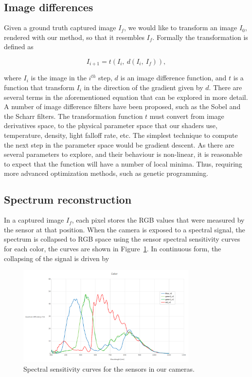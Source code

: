 \subsection{Image differences}
\label{sec:image_differences}

Given a ground truth captured image $I_f$, we would like to transform an image $I_0$, rendered with our method, so that it resembles $I_f$.
Formally the transformation is defined as

\begin{equation}
I_{i+1} = t(I_i,~d(I_i,~I_f)),
\end{equation}

where $I_i$ is the image in the $i^{th}$ step, $d$ is an image difference function, and $t$ is a function that transform $I_i$ in the direction of the gradient given by $d$.
There are several terms in the aforementioned equation that can be explored in more detail.
A number of image difference filters have been proposed, such as the Sobel and the Scharr filters.
The transformation function $t$ must convert from image derivatives space, to the physical parameter space that our shaders use, temperature, density, light falloff rate, etc.
The simplest technique to compute the next step in the parameter space would be gradient descent.
As there are several parameters to explore, and their behaviour is non-linear, it is reasonable to expect that the function will have a number of local minima. 
Thus, requiring more advanced optimization methods, such as genetic programming.

\subsection{Spectrum reconstruction}
\label{sec:spectrum_reconstruction}

In a captured image $I_f$, each pixel stores the RGB values that were measured by the sensor at that position.
When the camera is exposed to a spectral signal, the spectrum is collapsed to RGB space using the sensor spectral sensitivity curves for each color, the curves are shown in Figure~\ref{fig:camera_sensitivity}.
In continuous form, the collapsing of the signal is driven by

\begin{figure}[htbp!]
\centering
\includegraphics[width=0.8\textwidth]{img/camera_sensitivity}
	\caption{Spectral sensitivity curves for the sensors in our cameras.}
	\label{fig:camera_sensitivity}
\end{figure}

